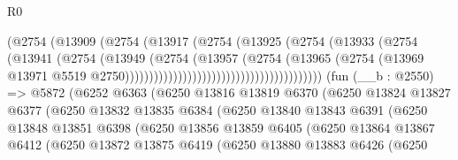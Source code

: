 \begin{lexlean}{R0}
\begin{coremodule}
                                                  (@2754
                                                    (@13909
                                                      (@2754
                                                        (@13917
                                                          (@2754
                                                            (@13925
                                                              (@2754
                                                                (@13933
                                                                  (@2754
                                                                    (@13941
                                                                      (@2754
                                                                        (@13949
                                                                          (@2754
                                                                            (@13957
                                                                              (@2754
                                                                                (@13965
                                                                                  (@2754
                                                                                    (@13969
                                                                                      @13971
                                                                                      @5519
                                                                                      @2750)))))))))))))))))))))))))))))))))))))))))
    (fun (__b : @2550) =>
    @5872
      (@6252
        @6363
        (@6250
          @13816
          @13819
          @6370
          (@6250
            @13824
            @13827
            @6377
            (@6250
              @13832
              @13835
              @6384
              (@6250
                @13840
                @13843
                @6391
                (@6250
                  @13848
                  @13851
                  @6398
                  (@6250
                    @13856
                    @13859
                    @6405
                    (@6250
                      @13864
                      @13867
                      @6412
                      (@6250
                        @13872
                        @13875
                        @6419
                        (@6250
                          @13880
                          @13883
                          @6426
                          (@6250

\end{coremodule}
\end{lexlean}
